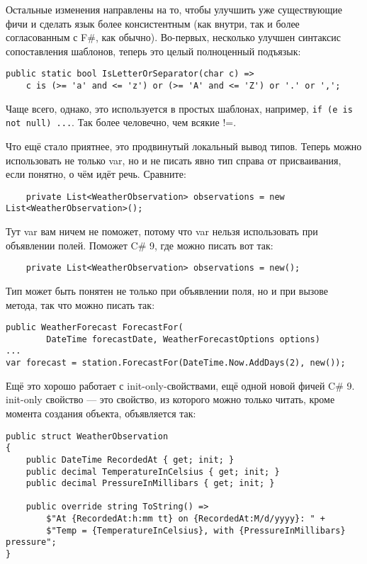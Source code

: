 \documentclass[a5paper]{article}
\begin{document}
Остальные изменения направлены на то, чтобы улучшить уже существующие фичи и сделать язык более консистентным (как внутри, так и более согласованным с F\#, как обычно). Во-первых, несколько улучшен синтаксис сопоставления шаблонов, теперь это целый полноценный подъязык:

\begin{verbatim}
public static bool IsLetterOrSeparator(char c) =>
    c is (>= 'a' and <= 'z') or (>= 'A' and <= 'Z') or '.' or ',';
\end{verbatim}

Чаще всего, однако, это используется в простых шаблонах, например, \texttt{if (e is not null) ...}. Так более человечно, чем всякие !=.

Что ещё стало приятнее, это продвинутый локальный вывод типов. Теперь можно использовать не только var, но и не писать явно тип справа от присваивания, если понятно, о чём идёт речь. Сравните:

\begin{verbatim}
    private List<WeatherObservation> observations = new List<WeatherObservation>();
\end{verbatim}

Тут var вам ничем не поможет, потому что var нельзя использовать при объявлении полей. Поможет C\# 9, где можно писать вот так:

\begin{verbatim}
    private List<WeatherObservation> observations = new();
\end{verbatim}

Тип может быть понятен не только при объявлении поля, но и при вызове метода, так что можно писать так:

\begin{verbatim}
public WeatherForecast ForecastFor(
        DateTime forecastDate, WeatherForecastOptions options)
...
var forecast = station.ForecastFor(DateTime.Now.AddDays(2), new());
\end{verbatim}


Ещё это хорошо работает с init-only-свойствами, ещё одной новой фичей C\# 9. init-only свойство --- это свойство, из которого можно только читать, кроме момента создания объекта, объявляется так:

\begin{verbatim}
public struct WeatherObservation
{
    public DateTime RecordedAt { get; init; }
    public decimal TemperatureInCelsius { get; init; }
    public decimal PressureInMillibars { get; init; }

    public override string ToString() =>
        $"At {RecordedAt:h:mm tt} on {RecordedAt:M/d/yyyy}: " +
        $"Temp = {TemperatureInCelsius}, with {PressureInMillibars} pressure";
}
\end{verbatim}
\end{document}
